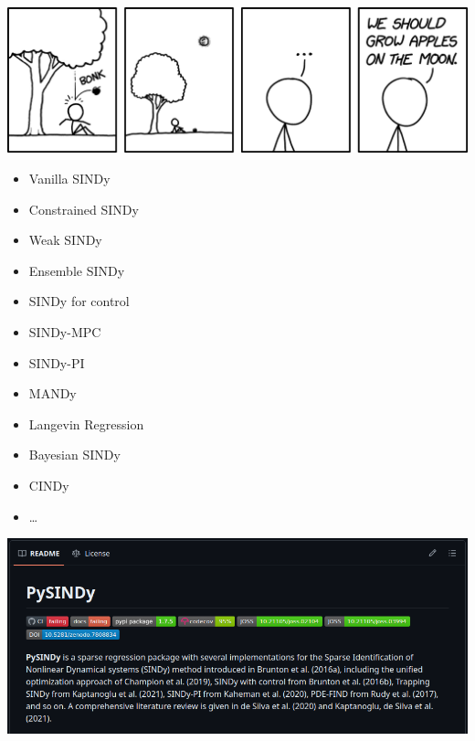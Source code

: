\documentclass[aspectratio=169,compress,12pt]{beamer}
\begin{document}
\begin{frame}[plain]
    \vfill
    \centering
    \includegraphics[width=.8\textwidth]{imgs/newton.png}
    \vfill
\end{frame}

\begin{frame}
	\vfill
        \small
        \begin{multicols}{2}
            \begin{itemize}
                \item Vanilla SINDy
                \item Constrained SINDy
                \item Weak SINDy
                \item Ensemble SINDy
                \item SINDy for control
                \item SINDy-MPC
                \item SINDy-PI
                \item MANDy
                \item Langevin Regression
                \item Bayesian SINDy
                \item CINDy
                \item \ldots
            \end{itemize}
            \end{multicols}
    	\vfill
\end{frame}

\begin{frame}
    \vfill
    \centering
    \includegraphics[width=.8\textwidth]{imgs/pysindy.png}
    \vfill
\end{frame}
\end{document}

